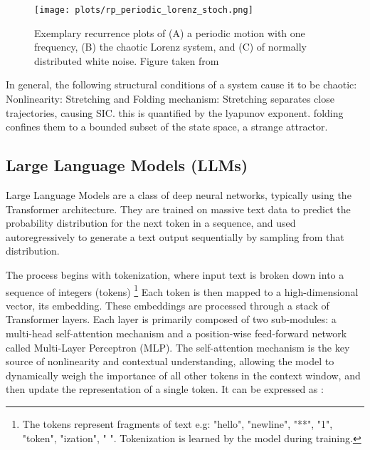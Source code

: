 \documentclass[a4paper,12pt]{article}
\begin{document}
\begin{figure}[H]
    \centering
    \texttt{[image: plots/rp\_periodic\_lorenz\_stoch.png]}
    \caption{Exemplary recurrence plots of (A) a periodic motion with one frequency, (B) the chaotic Lorenz system, and (C) of normally distributed white noise. Figure taken from \cite{DONNER_2011}}
    \label{fig:rp_examples}
\end{figure}


In general, the following structural conditions of a system cause it to be chaotic:
Nonlinearity: %
Stretching and Folding mechanism: Stretching separates close trajectories, causing SIC. this is quantified by the lyapunov exponent. folding confines them to a bounded subset of the state space, a strange attractor.
\cite{Hnon1976ATM}
\cite{ROSSLER1976}
\cite{strogatz_textbook}


\subsection{Large Language Models (LLMs)}
\label{subsec:llms}
Large Language Models are a class of deep neural networks, typically using the Transformer architecture. They are trained on massive text data to predict the probability distribution for the next token in a sequence, and used autoregressively to generate a text output sequentially by sampling from that distribution.

The process begins with tokenization, where input text is broken down into a sequence of integers (tokens) \footnote{The tokens represent fragments of text e.g: "hello", "newline", "**", "1", "token", "ization", " ". Tokenization is learned by the model during training.} Each token is then mapped to a high-dimensional vector, its embedding. These embeddings are processed through a stack of Transformer layers. Each layer is primarily composed of two sub-modules: a multi-head self-attention mechanism and a position-wise feed-forward network called Multi-Layer Perceptron (MLP). The self-attention mechanism is the key source of nonlinearity and contextual understanding, allowing the model to dynamically weigh the importance of all other tokens in the context window, and then update the representation of a single token. It can be expressed as \cite{attention}:
\end{document}
